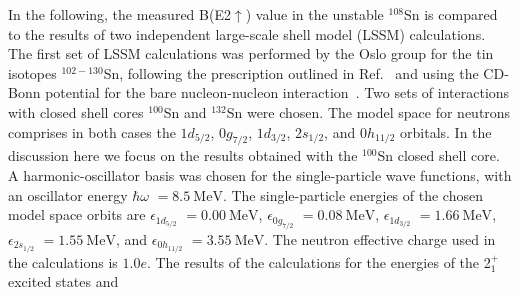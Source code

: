 \documentclass[prc,twocolumn,amssymb,amsmath,showpacs,superscriptaddress]{revtex4}
\begin{document}
In the following, the measured B(E2$\uparrow$) value in the
unstable $^{108}$Sn is compared to the results of two independent
large-scale shell model (LSSM) calculations. The first set of LSSM
calculations was performed by the Oslo group for the tin isotopes
$^{102-130}$Sn, following the prescription outlined in
Ref.~\cite{hjo95} and using the CD-Bonn potential for the bare
nucleon-nucleon interaction~\cite{mac96}. Two sets of interactions
with closed shell cores $^{100}$Sn and $^{132}$Sn were chosen. The
model space for neutrons comprises in both cases the $1d_{5/2}$,
$0g_{7/2}$, $1d_{3/2}$, $2s_{1/2}$, and $0h_{11/2}$ orbitals. In
the discussion here we focus on the results obtained with the
$^{100}$Sn closed shell core. A harmonic-oscillator basis was
chosen for the single-particle wave functions, with an oscillator
energy $\hbar\omega$ $= 8.5\ \text{MeV}$. The single-particle
energies of the chosen model space orbits are
$\epsilon_{1d_{5/2}}$ $= 0.00\ \text{MeV}$, $\epsilon_{0g_{7/2}}$
$= 0.08\ \text{MeV}$, $\epsilon_{1d_{3/2}}$ $= 1.66\ \text{MeV}$,
$\epsilon_{2s_{1/2}}$ $ = 1.55\ \text{MeV}$, and
$\epsilon_{0h_{11/2}}$ $= 3.55\ \text{MeV}$. The neutron effective
charge used in the calculations is $1.0e$. The results of the
calculations for the energies of the 2$^+_1$ excited states and
\end{document}
